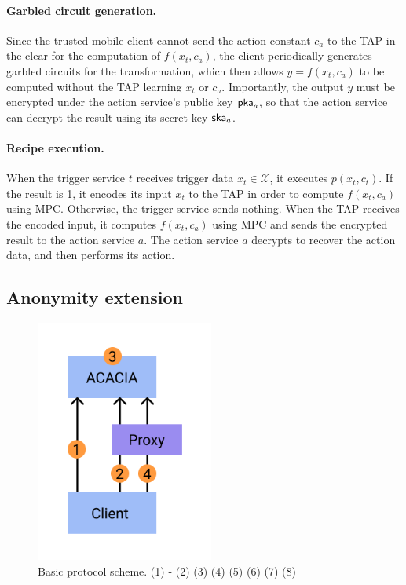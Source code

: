 
\paragraph{Garbled circuit generation.}
Since the trusted mobile client cannot send the action constant $c_a$ to the TAP
in the clear for the computation of $f(x_t, c_a)$, the client periodically
generates garbled circuits for the transformation, which then allows $y = f(x_t,
c_a)$ to be computed without the TAP learning $x_t$ or $c_a$. Importantly, the
output $y$ must be encrypted under the action service's public key $\mathsf{pka}_a$, so
that the action service can decrypt the result using its secret key $\mathsf{ska}_a$.

\paragraph{Recipe execution.}
When the trigger service $t$ receives trigger data $x_t \in \mathcal{X}$, it
executes $p(x_t, c_t)$. If the result is 1, it encodes its input $x_t$ to the
TAP in order to compute $f(x_t, c_a)$ using MPC. Otherwise, the trigger service
sends nothing. When the TAP receives the encoded input, it computes $f(x_t,
c_a)$ using MPC and sends the encrypted result to the action service $a$. The
action service $a$ decrypts to recover the action data, and then performs its
action.

\subsection{Anonymity extension}

\begin{figure}
\includegraphics[height=8cm]{graphics/Proxy1.png}
\caption{Basic protocol scheme. (1) - (2) (3) (4) (5) (6) (7) (8)}
\end{figure}


